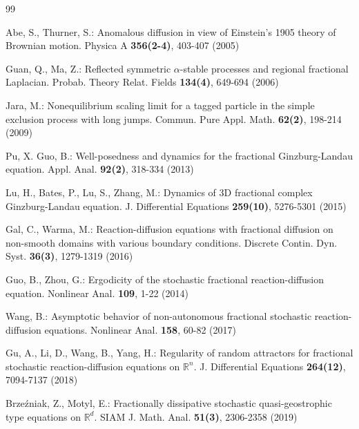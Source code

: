 \documentclass[11pt]{article}
\numberwithin{equation}{section}
\theoremstyle{plain}
\begin{document}
\begin{thebibliography}{99}



  Abe, S.,  Thurner, S.:
  Anomalous diffusion in view of Einstein's 1905 theory of Brownian motion.
  Physica A {\bf 356(2-4)}, 403-407 (2005)

  Guan, Q., Ma, Z.:
  Reflected symmetric $\alpha$-stable processes and regional fractional Laplacian.
  Probab. Theory Relat. Fields {\bf 134(4)}, 649-694 (2006)

  Jara, M.:
  Nonequilibrium scaling limit for a tagged particle in the simple exclusion process with long jumps.
  Commun. Pure Appl. Math. {\bf 62(2)}, 198-214 (2009)



  Pu, X.  Guo, B.:
  Well-posedness and dynamics for the fractional Ginzburg-Landau equation.
  Appl. Anal. {\bf 92(2)}, 318-334 (2013)


  Lu, H.,  Bates, P.,  Lu, S.,  Zhang, M.:
  Dynamics of 3D fractional complex Ginzburg-Landau equation.
  J. Differential Equations {\bf 259(10)}, 5276-5301 (2015)

  Gal, C.,  Warma, M.:
  Reaction-diffusion equations with fractional diffusion on non-smooth domains with various boundary conditions.
  Discrete Contin. Dyn. Syst. {\bf 36(3)}, 1279-1319 (2016)



  Guo, B.,  Zhou, G.:
  Ergodicity of the stochastic fractional reaction-diffusion equation.
  Nonlinear Anal. {\bf 109}, 1-22 (2014)

  Wang, B.:
  Asymptotic behavior of non-autonomous fractional stochastic reaction-diffusion equations.
  Nonlinear Anal. {\bf 158}, 60-82 (2017)

  Gu, A.,  Li, D.,  Wang, B.,  Yang, H.:
  Regularity of random attractors for fractional stochastic reaction-diffusion equations on $\mathbb{R}^n$.
  J. Differential Equations  {\bf 264(12)}, 7094-7137 (2018)


  Brze\'{z}niak, Z.,  Motyl, E.:
  Fractionally dissipative stochastic quasi-geostrophic type equations on $\mathbb{R}^d$.
  SIAM J. Math. Anal. {\bf 51(3)}, 2306-2358 (2019)


\end{thebibliography}
\end{document}
